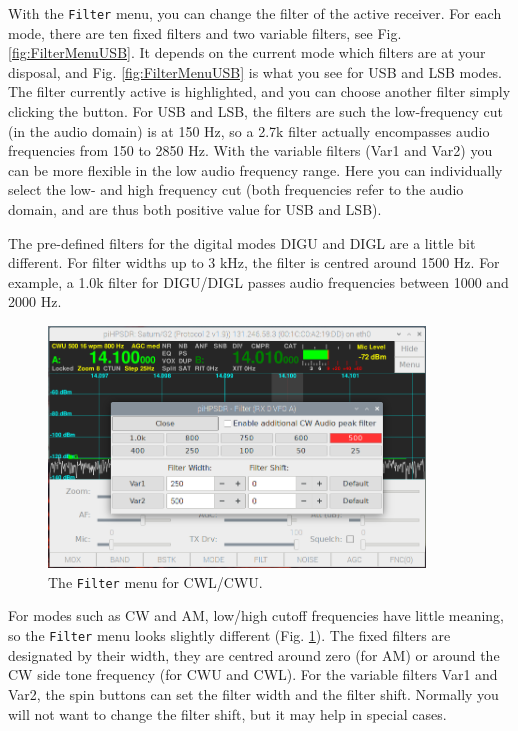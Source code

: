 \documentclass[12pt]{book}
\def\bltt#1{\texttt{\color{blue}#1}}
\begin{document}
With the \bltt{Filter} menu, you can change the filter of the active receiver. For each mode,
there
are ten fixed filters and two variable filters, see Fig. \ref{fig:FilterMenuUSB}. It
depends on the current mode which filters are at your disposal, and Fig. \ref{fig:FilterMenuUSB}
is what you see for USB and LSB modes. The filter currently active is highlighted, and
you can choose another filter simply clicking the button. For USB and LSB, the filters
are such the low-frequency cut (in the audio domain) is at 150 Hz, so a 2.7k filter
actually encompasses audio frequencies from 150 to 2850 Hz. With the variable filters
(Var1 and Var2) you can be more flexible in the low audio frequency range. Here you
can individually select the low- and high frequency cut (both frequencies refer to
the audio domain, and are thus both positive value for USB and LSB).

The pre-defined filters for the digital modes DIGU and DIGL are a little bit different.
For filter widths up to 3 kHz, the filter is centred around 1500 Hz. For example,
a 1.0k filter for DIGU/DIGL passes audio frequencies between 1000 and 2000 Hz.

\begin{figure}[ht]
\center
\includegraphics[width=10cm]{FilterMenuCW.png}
\caption{The \bltt{Filter} menu for CWL/CWU.}
\label{fig:FilterMenuCW}
\end{figure}

For modes such as CW and AM, low/high cutoff frequencies have little meaning, so the
\bltt{Filter} menu looks slightly different (Fig. \ref{fig:FilterMenuCW}). The fixed
filters are designated by their width, they are centred around zero (for AM) or around
the CW side tone frequency (for CWU and CWL). For the variable filters Var1 and Var2,
the spin buttons can set the filter width and the filter shift. Normally you will not
want to change the filter shift, but it may help in special cases.
\end{document}
